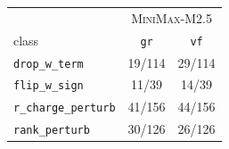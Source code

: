 \begin{tabular}{lcc}
\toprule
 & \multicolumn{2}{c}{\textsc{MiniMax-M2.5}} \\
class & \texttt{gr} & \texttt{vf} \\
\midrule
\texttt{drop\_w\_term} & 19/114 & 29/114 \\
\texttt{flip\_w\_sign} & 11/39 & 14/39 \\
\texttt{r\_charge\_perturb} & 41/156 & 44/156 \\
\texttt{rank\_perturb} & 30/126 & 26/126 \\
\bottomrule
\end{tabular}
